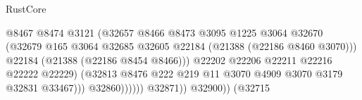 \begin{lexlean}{RustCore}
\begin{coremodule}
                                                          @8467
                                                          @8474
                                                          @3121
                                                          (@32657
                                                            @8466
                                                            @8473
                                                            @3095
                                                            @1225
                                                            @3064
                                                            @32670
                                                            (@32679
                                                              @165
                                                              @3064
                                                              @32685
                                                              @32605
                                                              @22184
                                                              (@21388 (@22186 @8460 @3070)))
                                                            @22184
                                                            (@21388 (@22186 @8454 @8466)))
                                                          @22202
                                                          @22206
                                                          @22211
                                                          @22216
                                                          @22222
                                                          @22229)
                                                        (@32813
                                                          @8476
                                                          @222
                                                          @219
                                                          @11
                                                          @3070
                                                          @4909
                                                          @3070
                                                          @3179
                                                          @32831
                                                          @33467)))
                                                    @32860))))))
                                        @32871))
                                    @32900))
                                (@32715

\end{coremodule}
\end{lexlean}
